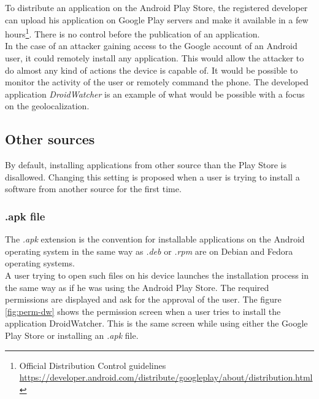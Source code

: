 To distribute an application on the Android Play Store, the registered developer can upload his application on Google Play servers and make it available in a few hours\footnote{Official Distribution Control guidelines \url{https://developer.android.com/distribute/googleplay/about/distribution.html}}.
There is no control before the publication of an application.\\

In the case of an attacker gaining access to the Google account of an Android user, it could remotely install any application.
This would allow the attacker to do almost any kind of actions the device is capable of.
It would be possible to monitor the activity of the user or remotely command the phone.
The developed application \emph{DroidWatcher} is an example of what would be possible with a focus on the geolocalization.


\subsection{Other sources}
By default, installing applications from other source than the Play Store is disallowed.
Changing this setting is proposed when a user is trying to install a software from another source for the first time.

\subsubsection{.apk file}
The \emph{.apk} extension is the convention for installable applications on the Android operating system in the same way as \emph{.deb} or \emph{.rpm} are on Debian and Fedora operating systems.\\

A user trying to open such files on his device launches the installation process in the same way as if he was using the Android Play Store.
The required permissions are displayed and ask for the approval of the user.
The figure \ref{fig:perm-dw} shows the permission screen when a user tries to install the application DroidWatcher.
This is the same screen while using either the Google Play Store or installing an \emph{.apk} file.\\

